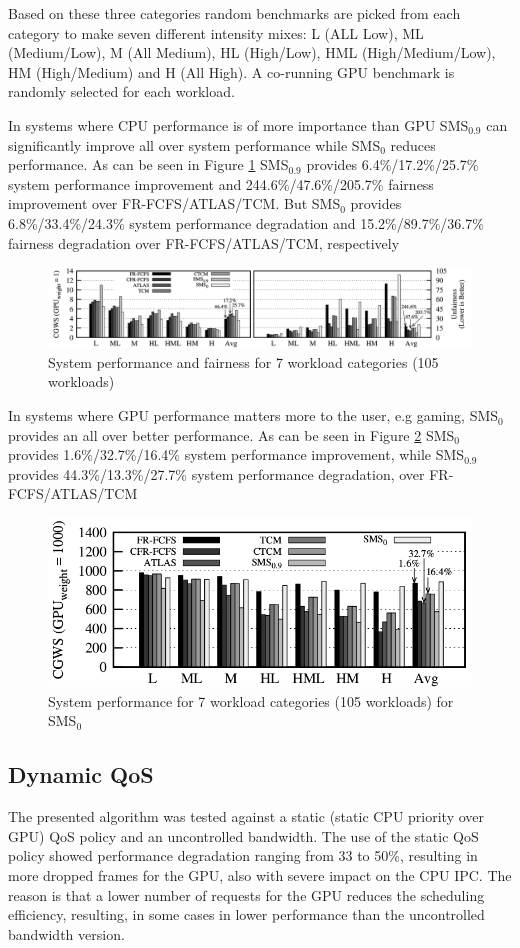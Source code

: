 \documentclass[journal]{IEEEtran}
\begin{document}
Based on these three categories random benchmarks are picked from each category to make seven different intensity mixes: L (ALL Low), ML (Medium/Low), M (All Medium), HL (High/Low),  HML (High/Medium/Low),  HM (High/Medium) and H (All High).  A co-running GPU benchmark is randomly selected for each workload.

In systems where CPU performance is of more importance than GPU SMS$_{0.9}$ can significantly improve all over system performance while SMS$_0$ reduces performance. As can be seen in Figure \ref{fig:SmS_GPU_1} SMS$_{0.9}$ provides 6.4\%/17.2\%/25.7\% system performance improvement and 244.6\%/47.6\%/205.7\% fairness improvement over FR-FCFS/ATLAS/TCM.
But SMS$_0$ provides 6.8\%/33.4\%/24.3\% system performance degradation and 15.2\%/89.7\%/36.7\% fairness degradation over FR-FCFS/ATLAS/TCM, respectively \cite{SmS}

\begin{figure}[H]
	\centering
	\includegraphics[width = 9.2 cm]{graphics/GPU_W_1.png}
	\caption{System performance and fairness for 7 workload categories (105 workloads) \cite{SmS}}\label{fig:SmS_GPU_1}
\end{figure}

In systems where GPU performance matters more to the user, e.g gaming, SMS$_0$ provides an all over better performance.  As can be seen in Figure \ref{fig:SmS_GPU_1000}  SMS$_0$ provides 1.6\%/32.7\%/16.4\% system performance improvement, while SMS$_{0.9}$ provides 44.3\%/13.3\%/27.7\% system performance degradation, over FR-FCFS/ATLAS/TCM

\begin{figure}[H]
	\centering
	\includegraphics[width = 9 cm]{graphics/GPU_W_1000.png}
	\caption{System performance for 7 workload categories (105 workloads) for SMS$_0$ \cite{SmS}}\label{fig:SmS_GPU_1000}
\end{figure}

\subsection{Dynamic QoS}
The presented algorithm was tested against a static (static CPU priority over GPU) QoS policy and an uncontrolled bandwidth. The use of the static QoS policy showed performance degradation ranging from 33 to 50\%, resulting in more dropped frames for the GPU, also with severe impact on the CPU IPC. The reason is that a lower number of requests for the GPU reduces the scheduling efficiency, resulting, in some cases in lower performance than the uncontrolled bandwidth version.
\end{document}
